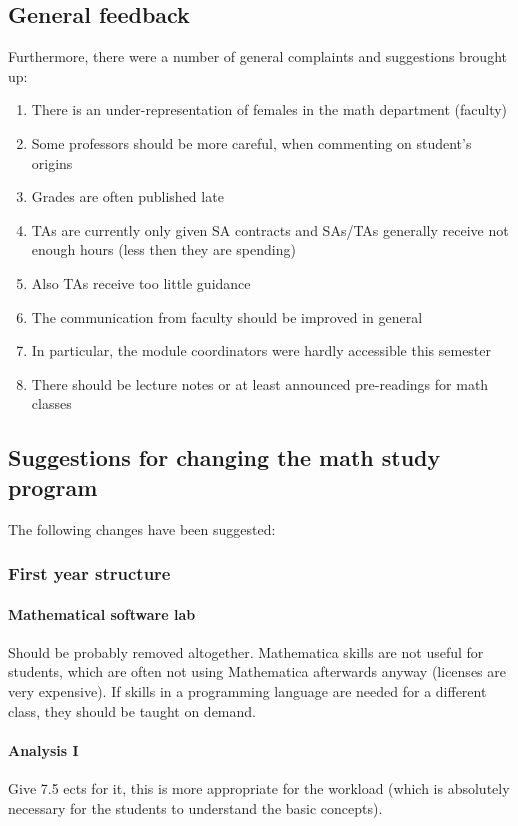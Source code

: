 \subsection{General feedback}
\label{sec-1-2}
\label{subsec:gen}
Furthermore, there were a number of general complaints and suggestions brought up:
\begin{enumerate}
\item There is an under-representation of females in the math department (faculty)
\item Some professors should be more careful, when commenting on student's origins
\item Grades are often published late
\item TAs are currently only given SA contracts and SAs/TAs generally receive not enough hours (less then they are spending)
\item Also TAs receive too little guidance
\item The communication from faculty should be improved in general
\item In particular, the module coordinators were hardly accessible this semester
\item There should be lecture notes or at least announced pre-readings for math classes
\end{enumerate}


\subsection{Suggestions for changing the math study program}
\label{sec-1-3}
\label{subsec:sug}
The following changes have been suggested:
\subsubsection{First year structure}
\label{sec-1-3-1}
\paragraph{Mathematical software lab} Should be probably removed altogether. Mathematica skills are not useful for students, which are often not using Mathematica afterwards anyway (licenses are very expensive). 
If skills in a programming language are needed for a different class, they should be taught on demand. 
\paragraph{Analysis I} Give 7.5 ects for it, this is more appropriate for the workload (which is absolutely necessary for the students to understand the basic concepts). 
